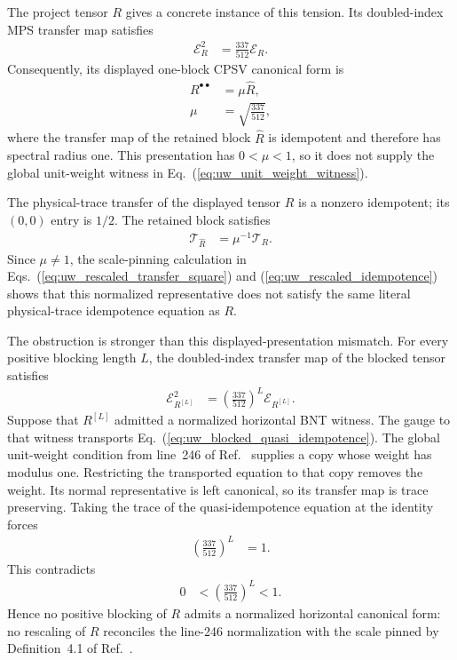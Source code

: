\documentclass{article}
\begin{document}
The project tensor $R$ gives a concrete instance of this tension. Its
doubled-index MPS transfer map satisfies
\begin{align}
    \mathcal E_R^2
    &=\frac{337}{512}\mathcal E_R.
    \label{eq:uw_dimer_transfer_quasi_idempotence}
\end{align}
Consequently, its displayed one-block CPSV canonical form is
\begin{align}
    R^{\bullet\bullet}
    &=\mu\widehat R,
    \label{eq:uw_dimer_canonical_form}\\
    \mu
    &=\sqrt{\frac{337}{512}},
    \label{eq:uw_dimer_weight}
\end{align}
where the transfer map of the retained block $\widehat R$ is idempotent and
therefore has spectral radius one. This presentation has $0<\mu<1$, so it does
not supply the global unit-weight witness in
Eq.~(\ref{eq:uw_unit_weight_witness}).

The physical-trace transfer of the displayed tensor $R$ is a nonzero
idempotent; its $(0,0)$ entry is $1/2$. The retained block satisfies
\begin{align}
    \mathcal T_{\widehat R}
    &=\mu^{-1}\mathcal T_R.
    \label{eq:uw_dimer_retained_transfer}
\end{align}
Since $\mu\ne1$, the scale-pinning calculation in
Eqs.~(\ref{eq:uw_rescaled_transfer_square}) and
(\ref{eq:uw_rescaled_idempotence}) shows that this normalized representative
does not satisfy the same literal physical-trace idempotence equation as $R$.

The obstruction is stronger than this displayed-presentation mismatch. For
every positive blocking length $L$, the doubled-index transfer map of the
blocked tensor satisfies
\begin{align}
    \mathcal E_{R^{[L]}}^2
    &=\left(\frac{337}{512}\right)^L\mathcal E_{R^{[L]}}.
    \label{eq:uw_blocked_quasi_idempotence}
\end{align}
Suppose that $R^{[L]}$ admitted a normalized horizontal BNT witness. The gauge
to that witness transports Eq.~(\ref{eq:uw_blocked_quasi_idempotence}). The
global unit-weight condition from line~246 of
Ref.~\cite{Cirac2016MPDO_arXiv} supplies a copy whose weight has modulus one.
Restricting the transported equation to that copy removes the weight. Its
normal representative is left canonical, so its transfer map is trace
preserving. Taking the trace of the quasi-idempotence equation at the identity
forces
\begin{align}
    \left(\frac{337}{512}\right)^L
    &=1.
    \label{eq:uw_blocked_unit_contradiction}
\end{align}
This contradicts
\begin{align}
    0
    &<\left(\frac{337}{512}\right)^L
    <1.
    \label{eq:uw_blocked_strict_bound}
\end{align}
Hence no positive blocking of $R$ admits a normalized horizontal canonical
form: no rescaling of $R$ reconciles the line-246 normalization with the scale
pinned by Definition~4.1 of Ref.~\cite{Cirac2016MPDO_arXiv}.
\end{document}
